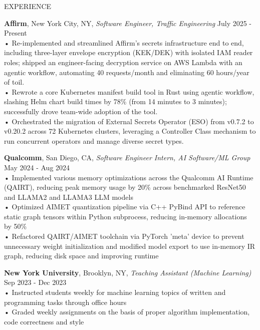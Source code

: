 \documentclass{resume} %
\begin{document}

\begin{rSection}{EXPERIENCE}

\textbf{Affirm}, New York City, NY, {\emph{Software Engineer, Traffic Engineering}} \hfill July 2025 - Present \\
• Re-implemented and streamlined Affirm's secrets infrastructure end to end, including three-layer envelope encryption (KEK/DEK) with isolated IAM reader roles; shipped an engineer-facing decryption service on AWS Lambda with an agentic workflow, automating 40 requests/month and eliminating 60 hours/year of toil. \\
• Rewrote a core Kubernetes manifest build tool in Rust using agentic workflow, slashing Helm chart build times by 78\% (from 14 minutes to 3 minutes); successfully drove team-wide adoption of the tool. \\
• Orchestrated the migration of External Secrets Operator (ESO) from v0.7.2 to v0.20.2 across 72 Kubernetes clusters, leveraging a Controller Class mechanism to run concurrent operators and manage diverse secret types.

\textbf{Qualcomm}, San Diego, CA, {\emph{Software Engineer Intern, AI Software/ML Group}} \hfill May 2024 - Aug 2024 \\
• Implemented various memory optimizations across the Qualcomm AI Runtime (QAIRT), reducing peak memory usage by 20\% across benchmarked ResNet50 and LLAMA2 and LLAMA3 LLM models \\
• Optimized AIMET quantization pipeline via C++ PyBind API to reference static graph tensors within Python subprocess, reducing in-memory allocations by 50\% \\
• Refactored QAIRT/AIMET toolchain via PyTorch 'meta' device to prevent unnecessary weight initialization and modified model export to use in-memory IR graph, reducing disk space and improving runtime \smallskip

\textbf{New York University}, Brooklyn, NY, {\emph{Teaching Assistant (Machine Learning)}} \hfill Sep 2023 - Dec 2023 \\
• Instructed students weekly for machine learning topics of written and programming tasks through office hours \\
• Graded weekly assignments on the basis of proper algorithm implementation, code correctness and style \smallskip


\end{rSection}
\end{document}
